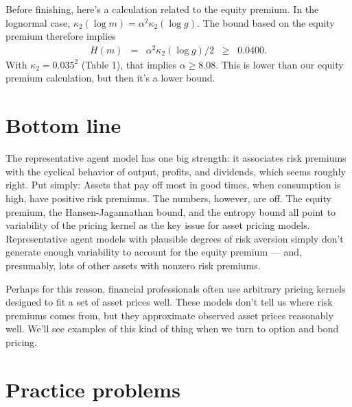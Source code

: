 \documentclass[11pt]{article}
\begin{document}
Before finishing, here's a calculation related to the equity premium.
In the lognormal case,
$\kappa_2(\log m) = \alpha^2 \kappa_2(\log g)$.
The bound based on the equity premium therefore implies
\begin{eqnarray*}
    H(m) &=& \alpha^2 \kappa_2(\log g)/2 \;\;\geq\;\; 0.0400 .
\end{eqnarray*}
With $\kappa_2 = 0.035^2 $ (Table 1),
that implies $\alpha \geq 8.08$.
This is lower than our equity premium calculation,
but then it's a lower bound.


%
%


\section*{Bottom line}

The representative agent model has one big strength:
it associates risk premiums with the cyclical behavior
of output, profits, and dividends, which seems roughly right.
Put simply: Assets that pay off most in good times, when consumption is high, 
have positive risk premiums. 
The numbers, however, are off.
The equity premium, the Hansen-Jagannathan bound, and the entropy bound
all point to variability of the pricing kernel as the key issue for asset pricing models.
Representative agent models with plausible degrees of risk aversion simply don't generate
enough variability to account for the equity premium --- and, presumably,
lots of other assets with nonzero risk premiums.

Perhaps for this reason, financial professionals often
use arbitrary pricing kernels designed to fit a set
of asset prices well.
These models don't tell us where risk premiums comes from,
but they approximate observed asset prices reasonably well.
We'll see examples of this kind of thing when we turn to option and bond pricing.


\section*{Practice problems}
\end{document}
